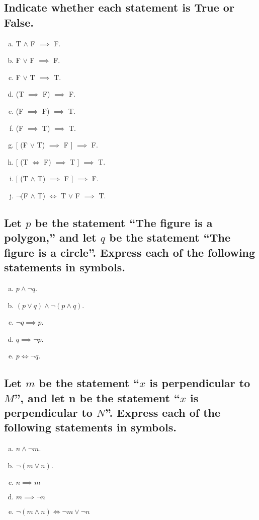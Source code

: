 \documentclass[12pt]{scrartcl} %
\begin{document}
\subsection{Indicate whether each statement is True or False.}
\begin{enumerate}[(a)]
	\item T $\land$ F $\implies$ F.
	\item F $\lor$ F $\implies$ F.
	\item F $\lor$ T $\implies$ T.
	\item (T $\implies$ F) $\implies$ F.
	\item (F $\implies$ F) $\implies$ T.
	\item (F $\implies$ T) $\implies$ T.
	\item {[} (F $\lor$ T) $\implies$ F {]} $\implies$ F.
	\item {[} (T $\iff$ F) $\implies$ T {]} $\implies$ T.
	\item {[} (T $\land$ T) $\implies$ F {]} $\implies$ F.
	\item $\neg$(F $\land$ T) $\iff$ T $\lor$ F $\implies$ T.
\end{enumerate}

\subsection{Let $p$ be the statement ``The figure is a polygon,'' and let $q$ be the statement ``The figure is a circle''. Express each of the following statements in
symbols.}
\begin{enumerate}[(a)]
	\item $p \land \neg q$.
	\item $(p \lor q) \land \neg (p \land q)$.
	\item $\neg q \implies p$.
	\item $q \implies \neg p$.
	\item $p \iff \neg q$.

\end{enumerate}
\subsection{Let $m$ be the statement ``$x$ is perpendicular to $M$'', and let n be the statement
``$x$ is perpendicular to $N$''. Express each of the following statements in
symbols.}
\begin{enumerate}[(a)]
	\item $n \land \neg m$.
	\item $\neg (m \lor n)$.
	\item $n \implies m$
	\item $m \implies \neg n$
	\item $ \neg (m \land n) \iff \neg m \lor \neg n$
\end{enumerate}
\end{document}
